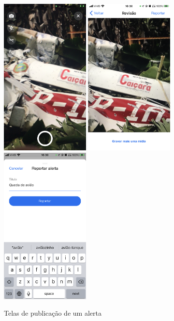 \begin{figure}[htbp]
	\caption{\small Telas de publicação de um alerta} 
	\begin{center}
		\includegraphics[height=8cm]{images/lazarus-camera.png}
		\includegraphics[height=8cm]{images/lazarus-reporting-1.png} \quad
		\includegraphics[height=8cm]{images/lazarus-reporting-2.png}
	\end{center}
	\label{f.lazarus-reporting}
\end{figure}

